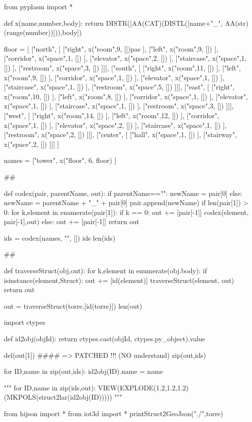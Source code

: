 from pyplasm import *

def x(name,number,body):
    return DISTR([AA(CAT)(DISTL([name+"_",
                 AA(str)(range(number))])),body])


floor = [
	["north", [
		["right", x("room",9, [])pas ],
     	["left", x("room",9, []) ],
		["corridor", x("space",1, []) ],
		["elevator", x("space",2, []) ],
		["staircase", x("space",1, []) ],
		["restroom", x("space",3, []) ]]],
	["south", [
	 	["right", x("room",11, []) ],
		["left", x("room",9, []) ],
		["corridor", x("space",1, []) ],
		["elevator", x("space",1, []) ],
		["staircase", x("space",1, []) ],
		["restroom", x("space",5, []) ]]],
	["east", [
	 	["right", x("room",10, []) ],
		["left", x("room",8, []) ],
		["corridor", x("space",1, []) ],
		["elevator", x("space",1, []) ],
		["staircase", x("space",1, []) ],
		["restroom", x("space",3, []) ]]],
	["west", [
	 	["right", x("room",14, []) ],
		["left", x("room",12, []) ],
		["corridor", x("space",1, []) ],
		["elevator", x("space",2, []) ],
		["staircase", x("space",1, []) ],
		["restroom", x("space",2, []) ]]],
	["center", [
	 	["hall", x("space",1, []) ],
		["stairway", x("space",2, []) ]]]
	]

names = ["tower", x("floor", 6, floor) ]

##

def codex(pair, parentName, out):
	if parentName=="": newName = pair[0]
	else: newName = parentName + "_" + pair[0]
	pair.append(newName)
	if len(pair[1]) > 0:
		for k,element in enumerate(pair[1]):
			if k == 0: out += [pair[-1]]
			codex(element, pair[-1],out)
	else: out += [pair[-1]]
	return out
	
ids = codex(names, "", [])
ids
len(ids)


##

def traverseStruct(obj,out):
    for k,element in enumerate(obj.body):
        if isinstance(element,Struct): 
            out += [id(element)]
            traverseStruct(element, out)
    return out

out = traverseStruct(torre,[id(torre)])
len(out)

import ctypes

def id2obj(objId):
	return ctypes.cast(objId, ctypes.py_object).value
	
del(out[1])	 #### => PATCHED !!! (NO understand)
zip(out,ids)

for ID,name in zip(out,ids):
    id2obj(ID).name = name

"""
for ID,name in zip(ids,out):
	VIEW(EXPLODE(1.2,1.2,1.2)(MKPOLS(struct2lar(id2obj(ID)))))
"""

from hijson import *
from iot3d import *
printStruct2GeoJson("./",torre)




